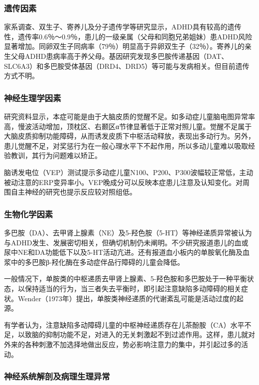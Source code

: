 \subsubsection{遗传因素}

家系调查、双生子、寄养儿及分子遗传学等研究显示，ADHD具有较高的遗传性，遗传率0.6％～0.9％，患儿的一级亲属（父母和同胞兄弟姐妹）患ADHD风险显著增加。同卵双生子同病率（79％）明显高于异卵双生子（32％）。寄养儿的亲生父母ADHD患病率高于养父母。基因研究发现多巴胺传递基因（DAT、SLC6A3）和多巴胺受体基因（DRD4、DRD5）等可能与发病相关。但目前遗传方式不明。

\subsubsection{神经生理学因素}

研究资料显示，本症可能是由于大脑皮质的觉醒不足。如多动症儿童脑电图异常率高，慢波活动增加，顶枕区、右颞区α节律显著低于正常对照儿童。觉醒不足属于大脑皮质抑制功能障碍，从而诱发皮质下中枢活动释放，表现出多动行为。另外，患儿觉醒不足，对奖惩行为在一般心理水平下不起作用，所以多动儿童难以吸取经验教训，其行为问题难以矫正。

脑诱发电位（VEP）测试提示多动症儿童N100、P200、P300波幅较正常低，主动被动注意的ERP变异率小。VEP晚成分可以反映本症患儿注意及认知变化。对周围自主神经的研究也提示反应较对照组低。

\subsubsection{生物化学因素}

多巴胺（DA）、去甲肾上腺素（NE）及5-羟色胺（5-HT）等神经递质异常被认为与ADHD发生、发展密切相关，但确切机制仍未阐明。不少研究报道患儿的血或尿中NE和DA功能低下以及5-HT活动亢进。还有报道血小板内的单胺氧化酶及血浆中的多巴胺β-羟化酶在多动症伴品行障碍的儿童会降低。

一般情况下，单胺类的中枢递质去甲肾上腺素、5-羟色胺和多巴胺处于一种平衡状态，以保持适当的行为，当三者失去平衡时，即引起注意缺陷多动障碍的相关症状。Wender（1973年）提出，单胺类神经递质的代谢紊乱可能是活动过度的起源。

有学者认为，注意缺陷多动障碍儿童的中枢神经递质存在儿茶酚胺（CA）水平不足，以致脑的抑制功能不足，对进入的无关刺激起不到过滤作用。这样，患儿就对外来的各种刺激不加选择地做出反应，势必影响注意力的集中，并引起过多的活动。

\subsubsection{神经系统解剖及病理生理异常}

